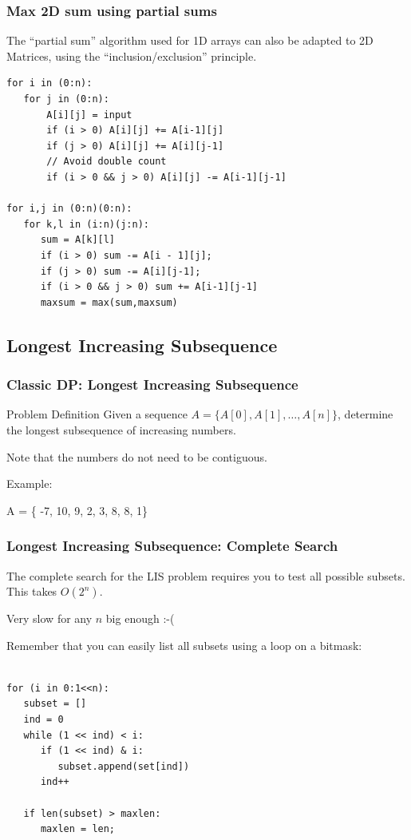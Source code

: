 \documentclass{beamer}
\begin{document}
\begin{frame}
  \frametitle{Max 2D sum using partial sums}
  \begin{block}{}
    The ``partial sum'' algorithm used for 1D arrays can also be
    adapted to 2D Matrices, using the ``inclusion/exclusion''
    principle.
  \end{block}

{\smaller
\begin{verbatim}
for i in (0:n):
   for j in (0:n):
       A[i][j] = input
       if (i > 0) A[i][j] += A[i-1][j]
       if (j > 0) A[i][j] += A[i][j-1]
       // Avoid double count
       if (i > 0 && j > 0) A[i][j] -= A[i-1][j-1]  

for i,j in (0:n)(0:n):
   for k,l in (i:n)(j:n):
      sum = A[k][l]
      if (i > 0) sum -= A[i - 1][j];
      if (j > 0) sum -= A[i][j-1];
      if (i > 0 && j > 0) sum += A[i-1][j-1]
      maxsum = max(sum,maxsum)   
\end{verbatim}
}

\end{frame}

\subsection{Longest Increasing Subsequence}

\begin{frame}
  \frametitle{Classic DP: Longest Increasing Subsequence}
  \begin{block}{Problem Definition}
    Given a sequence $A = \{A[0],A[1],\ldots,A[n]\}$, determine the 
    longest subsequence of increasing numbers.

    \smallskip

    Note that the numbers do not need to be contiguous.
  \end{block}

  Example:

  \bigskip

  A = \{ \alert{-7}, 10, 9, \alert{2}, \alert{3}, \alert{8}, 8, 1\}
\end{frame}

\begin{frame}
  \frametitle{Longest Increasing Subsequence: Complete Search}

  The complete search for the LIS problem requires you to test 
  all possible subsets. This takes $O(2^n)$. 

  \bigskip

  Very slow for any $n$ big enough :-(

  {\small
  \begin{block}{}
    Remember that you can easily list all subsets using a loop on a bitmask:
    {\smaller
\begin{verbatim}

for (i in 0:1<<n):
   subset = []
   ind = 0
   while (1 << ind) < i:
      if (1 << ind) & i:
         subset.append(set[ind])
      ind++

   if len(subset) > maxlen:
      maxlen = len;
\end{verbatim}
    }
  \end{block}}
\end{frame}
\end{document}
